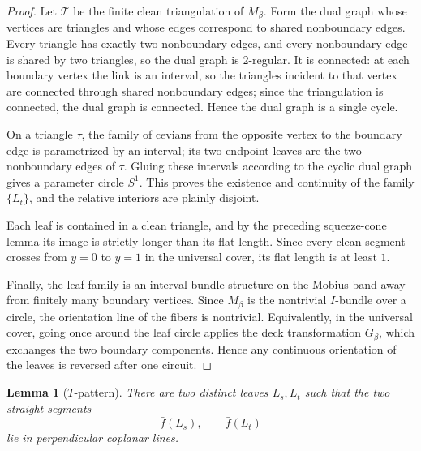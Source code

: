 \documentclass[11pt]{article}
\newtheorem{lemma}[theorem]{Lemma}
\begin{document}
\begin{proof}
Let \(\mathcal T\) be the finite clean triangulation of \(M_\beta\).  Form the dual graph whose vertices are triangles and whose edges correspond to shared nonboundary edges.  Every triangle has exactly two nonboundary edges, and every nonboundary edge is shared by two triangles, so the dual graph is \(2\)-regular.  It is connected: at each boundary vertex the link is an interval, so the triangles incident to that vertex are connected through shared nonboundary edges; since the triangulation is connected, the dual graph is connected.  Hence the dual graph is a single cycle.

On a triangle \(\tau\), the family of cevians from the opposite vertex to the boundary edge is parametrized by an interval; its two endpoint leaves are the two nonboundary edges of \(\tau\).  Gluing these intervals according to the cyclic dual graph gives a parameter circle \(S^1\).  This proves the existence and continuity of the family \(\{L_t\}\), and the relative interiors are plainly disjoint.

Each leaf is contained in a clean triangle, and by the preceding squeeze-cone lemma its image is strictly longer than its flat length.  Since every clean segment crosses from \(y=0\) to \(y=1\) in the universal cover, its flat length is at least \(1\).

Finally, the leaf family is an interval-bundle structure on the Mobius band away from finitely many boundary vertices.  Since \(M_\beta\) is the nontrivial \(I\)-bundle over a circle, the orientation line of the fibers is nontrivial.  Equivalently, in the universal cover, going once around the leaf circle applies the deck transformation \(G_\beta\), which exchanges the two boundary components.  Hence any continuous orientation of the leaves is reversed after one circuit.
\end{proof}

\begin{lemma}[\(T\)-pattern]
There are two distinct leaves \(L_s,L_t\) such that the two straight segments
\[
\bar f(L_s),\qquad \bar f(L_t)
\]
lie in perpendicular coplanar lines.
\end{lemma}
\end{document}
